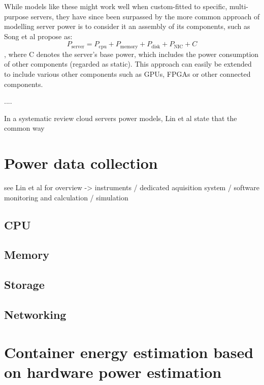 While models like these might work well when custom-fitted to specific, multi-purpose servers, they have since been surpassed by the more common approach of modelling server power is to consider it an assembly of its components, such as Song et al\parencite{song2013unified} propose as:
\begin{equation}
    P_{\text{server}} = P_{\text{cpu}} + P_{\text{memory}} + P_{\text{disk}} + P_{\text{NIC}} + C
\end{equation}
, where C denotes the server's base power, which includes the power consumption of other components (regarded as static). This approach can easily be extended to include various other components such as GPUs, FPGAs or other connected components.


....




In a systematic review cloud servers power models, Lin et al\parencite{lin2020taxonomy} state that the common way


\section{Power data collection}

see Lin et al for overview -> instruments / dedicated aquisition system / software monitoring and calculation / simulation

\subsection{CPU}

\subsection{Memory}

\subsection{Storage}

\subsection{Networking}

\section{Container energy estimation based on hardware power estimation}




